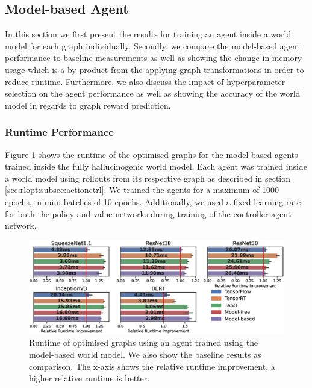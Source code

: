 \subsection{Model-based Agent}
\label{sec:eval:subsec:mbagent}

In this section we first present the results for training an agent inside a world model for each graph individually. Secondly, we compare the model-based agent performance to baseline measurements as well as showing the change in memory usage which is a by product from the applying graph transformations in order to reduce runtime. Furthermore, we also discuss the impact of hyperparameter selection on the agent performance as well as showing the accuracy of the world model in regards to graph reward prediction.

\subsubsection{Runtime Performance}

Figure \ref{fig:eval:world-model-runtimes} shows the runtime of the optimised graphs for the model-based agents trained inside the fully hallucinogenic world model. Each agent was trained inside a world model using rollouts from its respective graph as described in section \ref{sec:rlopt:subsec:actionctrl}. We trained the agents for a maximum of 1000 epochs, in mini-batches of 10 epochs. Additionally, we used a fixed learning rate for both the policy and value networks during training of the controller agent network.

\begin{figure}[h]
  \centering
  \includegraphics[width=1\columnwidth]{sections/5evaluation/images/runtimes_all_h}
  \caption[Runtimes of optimised graphs using a model-based controller]{Runtime of optimised graphs using an agent trained using the model-based world model. We also show the baseline results as comparison. The x-axis shows the relative runtime improvement, a higher relative runtime is better.}
  \label{fig:eval:world-model-runtimes}
\end{figure}

